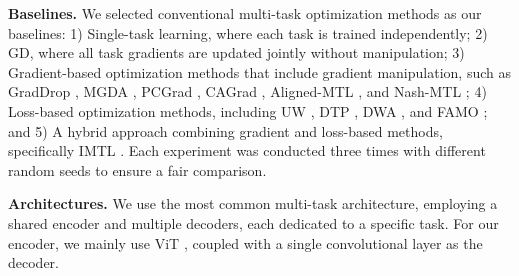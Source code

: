 \textbf{Baselines.} We selected conventional multi-task optimization methods as our baselines: 1) Single-task learning, where each task is trained independently; 2) GD, where all task gradients are updated jointly without manipulation; 3) Gradient-based optimization methods that include gradient manipulation, such as GradDrop \citep{RN21}, MGDA \citep{RN36}, PCGrad \citep{RN20}, CAGrad \citep{RN18}, Aligned-MTL \citep{senushkin2023independent}, and Nash-MTL \citep{navon2022multi}; 4) Loss-based optimization methods, including UW \citep{RN23}, DTP \citep{RN25}, DWA \citep{RN26}, and FAMO \citep{liu2024famo}; and 5) A hybrid approach combining gradient and loss-based methods, specifically IMTL \citep{liu2021towards}. Each experiment was conducted three times with different random seeds to ensure a fair comparison.

\textbf{Architectures.} We use the most common multi-task architecture, employing a shared encoder and multiple decoders, each dedicated to a specific task. For our encoder, we mainly use ViT \cite{vit}, coupled with a single convolutional layer as the decoder.


